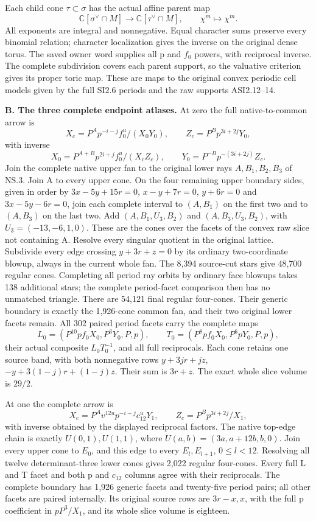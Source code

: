 Each child cone \(\tau\subset\sigma\) has the actual affine parent map
\[
 \mathbb C[\sigma^\vee\cap M]\longrightarrow
 \mathbb C[\tau^\vee\cap M],\qquad\chi^m\longmapsto\chi^m.
\]
All exponents are integral and nonnegative.  Equal character sums preserve
every binomial relation; character localization gives the inverse on the
original dense torus.  The saved owner word supplies all p and \(f_0\)
powers, with reciprocal inverse.  The complete subdivision covers each
parent support, so the valuative criterion gives its proper toric map.
These are maps to the original convex periodic cell models given by the
full SI2.6 periods and the raw supports ASI2.12--14.

\medskip\noindent\textbf{B. The three complete endpoint atlases.}
At zero the full native-to-common arrow is
\[
 X_c=P^Ap^{-i-j}f_0^u/(X_0Y_0),\qquad
 Z_c=P^Bp^{3i+2j}Y_0,
\]
with inverse
\[
 X_0=P^{A+B}p^{2i+j}f_0^u/(X_cZ_c),\qquad
 Y_0=P^{-B}p^{-(3i+2j)}Z_c.
\]
Join the complete native upper fan to the original lower rays
\(A,B_1,B_2,B_3\) of NS.3.  Join A to every upper cone.  On the four
remaining upper boundary sides, given in order by
\(3x-5y+15r=0\), \(x-y+7r=0\), \(y+6r=0\) and
\(3x-5y-6r=0\), join each complete interval to \((A,B_1)\) on the
first two and to \((A,B_3)\) on the last two.  Add
\((A,B_1,U_3,B_2)\) and \((A,B_3,U_3,B_2)\), with
\(U_3=(-13,-6,1,0)\).  These are the cones over the facets of the
convex raw slice not containing A.  Resolve every singular quotient
in the original lattice.  Subdivide every edge crossing
\(y+3r+z=0\) by its ordinary two-coordinate blowup, always in the current
whole fan.  The 8,394 source-cut stars give 48,700 regular cones.  Completing
all period ray orbits by ordinary face blowups takes 138 additional stars;
the complete period-facet comparison then has no unmatched triangle.
There are 54,121 final regular four-cones.  Their generic boundary is
exactly the 1,926-cone common fan, and their two original lower facets
remain.  All 302 paired period facets carry the complete maps
\[
L_0=(P^{10}pf_0X_0,P^3Y_0,P,p),\qquad
T_0=(P^8pf_0X_0,P^6pY_0,P,p),
\]
their actual composite \(L_0T_0^{-1}\), and all full reciprocals.
Each cone retains one source band, with both nonnegative rows
\(y+3jr+jz\), \(-y+3(1-j)r+(1-j)z\).  Their sum is \(3r+z\).
The exact whole slice volume is \(29/2\).

At one the complete arrow is
\[
 X_c=P^Av^{12u}p^{-i-j}c_{12}^uY_1,\qquad
 Z_c=P^Bp^{3i+2j}/X_1,
\]
with inverse obtained by the displayed reciprocal factors.  The native
top-edge chain is exactly
\(U(0,1),U(1,1)\), where
\(U(a,b)=(3a,a+12b,b,0)\).  Join every upper cone to \(E_0\), and this
edge to every \(E_l,E_{l+1}\), \(0\leq l<12\).  Resolving all twelve
determinant-three lower cones gives 2,022 regular four-cones.  Every full
L and T facet and both p and \(c_{12}\) columns agree with their
reciprocals.  The complete boundary has 1,926 generic facets and twenty-five
period pairs; all other facets are paired internally.  Its original source
rows are \(3r-x,x\), with the full p coefficient in \(pP^3/X_1\),
and its whole slice volume is eighteen.

